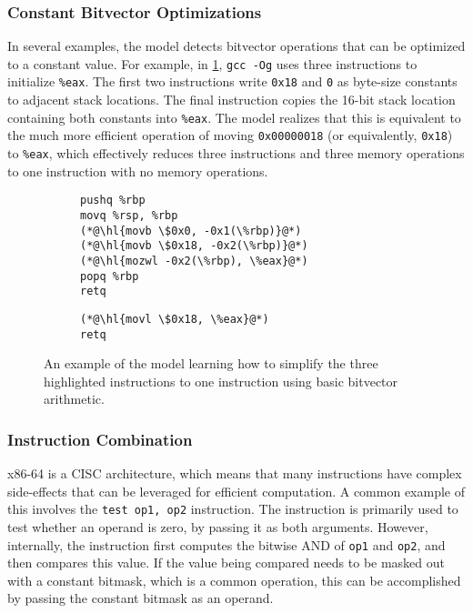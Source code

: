 \documentclass{article}
\begin{document}
\subsubsection{Constant Bitvector Optimizations}

In several examples, the model detects bitvector operations that can be optimized to a constant value.  For example, in \cref{fig:bitvector}, \texttt{gcc -Og} uses three instructions to initialize \lstinline{%eax}. The first two instructions write \lstinline{0x18} and \lstinline{0} as byte-size constants to adjacent stack locations.  The final instruction copies the 16-bit stack location containing both constants into \lstinline{%eax}.  The model realizes that this is equivalent to the much more efficient operation of moving \lstinline{0x00000018} (or equivalently, \lstinline{0x18}) to \lstinline{%eax}, which effectively reduces three instructions and three memory operations to one instruction with no memory operations.


\begin{figure}
\begin{subfigure}[t]{\codeboxwidth}
\begin{lstlisting}
pushq %rbp
movq %rsp, %rbp
(*@\hl{movb \$0x0, -0x1(\%rbp)}@*)
(*@\hl{movb \$0x18, -0x2(\%rbp)}@*)
(*@\hl{mozwl -0x2(\%rbp), \%eax}@*)
popq %rbp
retq
\end{lstlisting}
\caption{\ozerocodecaption}
\end{subfigure}
\hfil
\begin{subfigure}[t]{\codeboxwidth}
\begin{lstlisting}
(*@\hl{movl \$0x18, \%eax}@*)
retq
\end{lstlisting}
\caption{\modelcodecaption}
\end{subfigure}
    \centering
    \caption{An example of the model learning how to simplify the three highlighted instructions to one instruction using basic bitvector arithmetic.}
    \label{fig:bitvector}
\end{figure}

\subsubsection{Instruction Combination}

x86-64 is a CISC architecture, which means that many instructions have complex side-effects that can be leveraged for efficient computation.  
%
A common example of this involves the \lstinline{test op1, op2} instruction.  The instruction is primarily used to  test whether an operand is zero, by passing it as both arguments.  However, internally, the instruction first computes the bitwise AND of \lstinline{op1} and \lstinline{op2}, and then compares this value.   %
If the value being compared needs to be masked out with a constant bitmask, which is a common operation, this can be accomplished by passing the constant bitmask as an operand.
\end{document}

